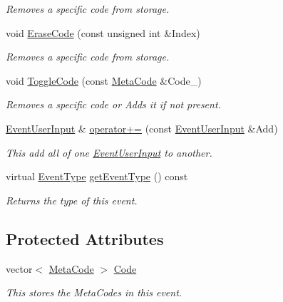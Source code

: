 \begin{DoxyCompactItemize}
\begin{DoxyCompactList}\small\item\em Removes a specific code from storage. \item\end{DoxyCompactList}\item 
void \hyperlink{classphys_1_1EventUserInput_a583084578443019d6e286b8f0e02ce58}{EraseCode} (const unsigned int \&Index)
\begin{DoxyCompactList}\small\item\em Removes a specific code from storage. \item\end{DoxyCompactList}\item 
void \hyperlink{classphys_1_1EventUserInput_adf603505c43162cf9331a486d5832f75}{ToggleCode} (const \hyperlink{classphys_1_1MetaCode}{MetaCode} \&Code\_\-)
\begin{DoxyCompactList}\small\item\em Removes a specific code or Adds it if not present. \item\end{DoxyCompactList}\item 
\hyperlink{classphys_1_1EventUserInput}{EventUserInput} \& \hyperlink{classphys_1_1EventUserInput_a1d6895e1b3814c1a63f5605b88ba85e5}{operator+=} (const \hyperlink{classphys_1_1EventUserInput}{EventUserInput} \&Add)
\begin{DoxyCompactList}\small\item\em This add all of one \hyperlink{classphys_1_1EventUserInput}{EventUserInput} to another. \item\end{DoxyCompactList}\item 
virtual \hyperlink{classphys_1_1EventBase_a5e6a8564e127f654123f0bf6a2751923}{EventType} \hyperlink{classphys_1_1EventUserInput_ab31bb312cde99c0a2bf64af012ee4b87}{getEventType} () const 
\begin{DoxyCompactList}\small\item\em Returns the type of this event. \item\end{DoxyCompactList}\end{DoxyCompactItemize}
\subsection*{Protected Attributes}
\begin{DoxyCompactItemize}
\item 
vector$<$ \hyperlink{classphys_1_1MetaCode}{MetaCode} $>$ \hyperlink{classphys_1_1EventUserInput_aee3dc1d8cac82482651487c48c6c60c9}{Code}
\begin{DoxyCompactList}\small\item\em This stores the MetaCodes in this event. \item\end{DoxyCompactList}\end{DoxyCompactItemize}



